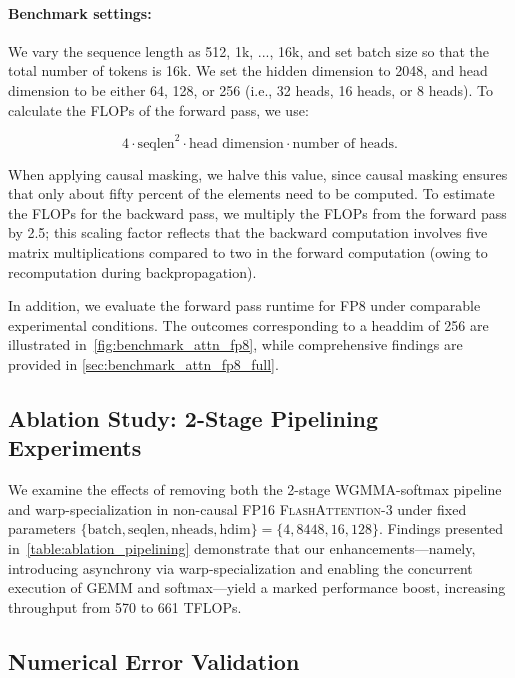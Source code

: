 \paragraph{Benchmark settings:} We vary the sequence length as 512, 1k, ..., 16k, and set batch size so that the total number of tokens is 16k. We set the hidden dimension to 2048, and head dimension to be either 64, 128, or 256 (i.e., 32 heads, 16 heads, or 8 heads). To calculate the FLOPs of the forward pass, we use:

\begin{equation*}
  4 \cdot \text{seqlen}^2 \cdot \text{head dimension} \cdot \text{number of heads}.
\end{equation*}

When applying causal masking, we halve this value, since causal masking ensures that only about fifty percent of the elements need to be computed. To estimate the FLOPs for the backward pass, we multiply the FLOPs from the forward pass by 2.5; this scaling factor reflects that the backward computation involves five matrix multiplications compared to two in the forward computation (owing to recomputation during backpropagation).

In addition, we evaluate the forward pass runtime for FP8 under comparable experimental conditions. The outcomes corresponding to a headdim of 256 are illustrated in~\cref{fig:benchmark_attn_fp8}, while comprehensive findings are provided in \cref{sec:benchmark_attn_fp8_full}.

\subsection{Ablation Study: 2-Stage Pipelining Experiments}
\label{sec:2-stage-pipelining-experiments}

We examine the effects of removing both the 2-stage WGMMA-softmax pipeline and warp-specialization in non-causal FP16 \textsc{FlashAttention-3} under fixed parameters $\{\text{batch}, \text{seqlen}, \text{nheads}, \text{hdim}\} = \{ 4, 8448, 16, 128\}$. Findings presented in~\cref{table:ablation_pipelining} demonstrate that our enhancements—namely, introducing asynchrony via warp-specialization and enabling the concurrent execution of GEMM and softmax—yield a marked performance boost, increasing throughput from 570 to 661 TFLOPs.

\subsection{Numerical Error Validation}
\label{sec:numerical_error}

